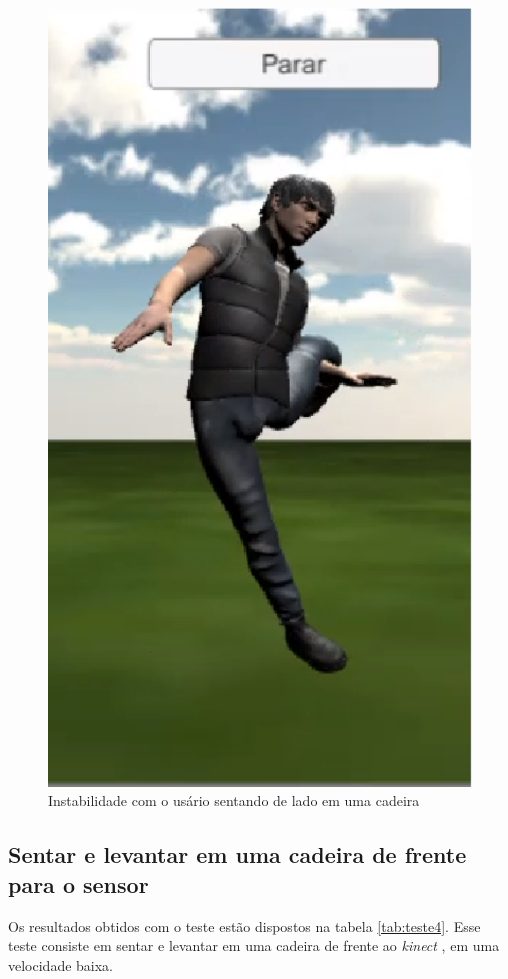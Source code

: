 \begin{figure}[H]
\centering
\includegraphics [keepaspectratio=true,scale=0.60]{figuras/cadeira.eps}
\caption{Instabilidade com o usário sentando de lado em uma cadeira}
\label{img:teste3}
\end{figure}

\subsection{Sentar e levantar em uma cadeira de frente para o sensor}\label{sub:teste4}
Os resultados obtidos com o teste estão dispostos na tabela \ref{tab:teste4}. Esse teste consiste em sentar e levantar em uma cadeira de frente ao \textit{kinect} , em uma velocidade
baixa.

